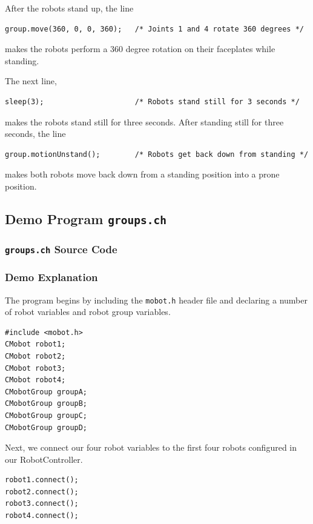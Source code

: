 \documentclass{article}
\begin{document}
After the robots stand up, the line
\begin{verbatim}
group.move(360, 0, 0, 360);   /* Joints 1 and 4 rotate 360 degrees */
\end{verbatim}
makes the robots perform a 360 degree rotation on their faceplates
while standing.

The next line, 
\begin{verbatim}
sleep(3);                     /* Robots stand still for 3 seconds */
\end{verbatim}
makes the robots stand still for three seconds. After standing
still for three seconds, the line
\begin{verbatim}
group.motionUnstand();        /* Robots get back down from standing */
\end{verbatim}
makes both robots move back down from a standing position into a prone
position.

\subsection{Demo Program \texttt{groups.ch}}
\subsubsection{\texttt{groups.ch} Source Code}

\subsubsection{Demo Explanation}
The program begins by including the \texttt{mobot.h} header file
and declaring a number of robot variables and robot group variables.
\begin{verbatim}
#include <mobot.h>
CMobot robot1;
CMobot robot2;
CMobot robot3;
CMobot robot4;
CMobotGroup groupA;
CMobotGroup groupB;
CMobotGroup groupC;
CMobotGroup groupD;
\end{verbatim}

Next, we connect our four robot variables to the first four robots 
configured in our RobotController.
\begin{verbatim}
robot1.connect();
robot2.connect();
robot3.connect();
robot4.connect();
\end{verbatim}
\end{document}
